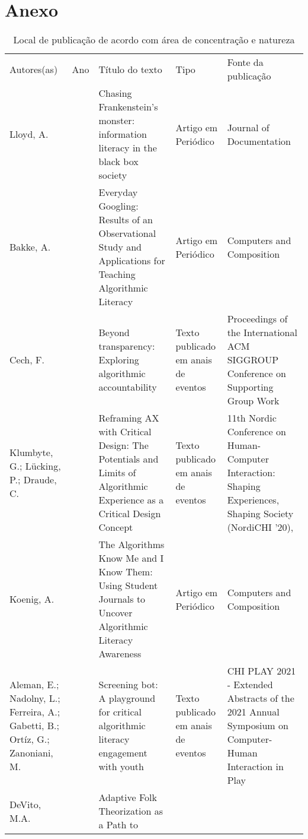 \section*{Anexo}\label{anexo-1}

\setlength\LTleft{-0.8in}
\setlength\LTright{-0.8in}
\begin{footnotesize}
\begin{longtable}{
    >{\raggedright\arraybackslash}p{}
    >{\raggedright\arraybackslash}p{}
    >{\raggedright\arraybackslash}p{}
    >{\raggedright\arraybackslash}p{}
    >{\raggedright\arraybackslash}p{}
    }
\caption{Local de publicação de acordo com área de concentração e natureza} \label{tab-anexo-1}\\
\\
\toprule
Autores(as) & Ano & Título do texto &Tipo &Fonte da publicação\\
\midrule
Lloyd, A. & 2019 & Chasing Frankenstein's monster: information literacy
in the black box society & Artigo em Periódico & Journal of
Documentation \\
Bakke, A. & 2020 & Everyday Googling: Results of an Observational Study
and Applications for Teaching Algorithmic Literacy & Artigo em Periódico
& Computers and Composition \\
Cech, F. & 2020 & Beyond transparency: Exploring algorithmic
accountability & Texto publicado em anais de eventos & Proceedings of
the International ACM SIGGROUP Conference on Supporting Group Work \\
Klumbyte, G.; Lücking, P.; Draude, C. & 2020 & Reframing AX with
Critical Design: The Potentials and Limits of Algorithmic Experience as
a Critical Design Concept & Texto publicado em anais de eventos & 11th
Nordic Conference on Human-Computer Interaction: Shaping Experiences,
Shaping Society (NordiCHI '20), \\
Koenig, A. & 2020 & The Algorithms Know Me and I Know Them: Using
Student Journals to Uncover Algorithmic Literacy Awareness & Artigo em
Periódico & Computers and Composition \\
Aleman, E.; Nadolny, L.; Ferreira, A.; Gabetti, B.; Ortíz, G.;
Zanoniani, M. & 2021 & Screening bot: A playground for critical
algorithmic literacy engagement with youth & Texto publicado em anais de
eventos & CHI PLAY 2021 - Extended Abstracts of the 2021 Annual
Symposium on Computer-Human Interaction in Play \\
DeVito, M.A. & 2021 & Adaptive Folk Theorization as a Path to

\end{longtable}
\end{footnotesize}
